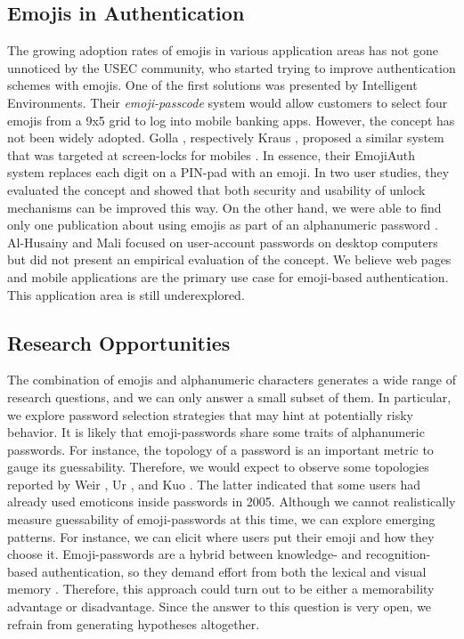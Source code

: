 \subsection{Emojis in Authentication}
The growing adoption rates of emojis in various application areas has not gone unnoticed by the \gls{USEC} community, who started trying to improve authentication schemes with emojis. One of the first solutions was presented by Intelligent Environments. Their \textit{emoji-passcode} system would allow customers to select four emojis from a 9x5 grid to log into mobile banking apps. However, the concept has not been widely adopted. Golla \etal, respectively Kraus \etal, proposed a similar system that was targeted at screen-locks for mobiles \cite{Golla2017EmojiAuth, Kraus2017Emoji}. In essence, their EmojiAuth system replaces each digit on a PIN-pad with an emoji. In two user studies, they evaluated the concept and showed that both security and usability of unlock mechanisms can be improved this way. On the other hand, we were able to find only one publication about using emojis as part of an alphanumeric password  \cite{AlHusainy2015EmojiPasswords}. Al-Husainy and Mali focused on user-account passwords on desktop computers but did not present an empirical evaluation of the concept. We believe web pages and mobile applications are the primary use case for emoji-based authentication. This application area is still underexplored. 

\subsection{Research Opportunities}
The combination of emojis and alphanumeric characters generates a wide range of research questions, and we can only answer a small subset of them. In particular, we explore password selection strategies that may hint at potentially risky behavior. It is likely that emoji-passwords share some traits of alphanumeric passwords. For instance, the topology of a password is an important metric to gauge its guessability. Therefore, we would expect to observe some topologies reported by Weir \etal  \cite{Weir2010MetricsPolicies}, Ur \etal \cite{Ur2015PWCreationLab}, and Kuo \etal \cite{Kuo2006HumanSelectionMnemonic}. The latter indicated that some users had already used emoticons inside passwords in 2005. Although we cannot realistically measure guessability of emoji-passwords at this time, we can explore emerging patterns. For instance, we can elicit where users put their emoji and how they choose it. Emoji-passwords are a hybrid between knowledge- and recognition-based authentication, so they demand effort from both the lexical and visual memory \cite{Renaud2009VisualSnakeOil}. Therefore, this approach could turn out to be either a memorability advantage or disadvantage. Since the answer to this question is very open, we refrain from generating hypotheses altogether.

